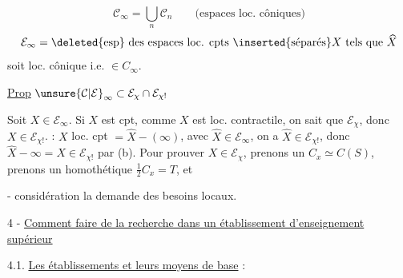 \[
\mathcal C_\infty=\bigcup_n\mathcal C_n\qquad\text{(espaces loc. côniques)}
\]
\[
\mathcal E_\infty=\deleted{\text{esp}}\text{ des espaces loc. cpts }\inserted{\text{séparés}}X\text{ tels que }\widehat X
\]
soit loc. cônique i.e. $\in C_\infty$.


\uline{Prop} $\unsure{\mathcal C|\mathcal E}_\infty\subset\mathcal E_\chi\cap\mathcal E_{\chi!}$

Soit $X\in\mathcal E_\infty$. Si $X$ est cpt,  comme $X$ est loc. contractile,
on sait que $\mathcal E_\chi$, donc $X\in\mathcal E_{\chi!}$.    : $X$ loc.
cpt $=\widehat X-(\infty)$, avec $\widehat X\in\mathcal E_\infty$, on a $\widehat X\in\mathcal E_{\chi!}$, donc
$\widehat X-\infty=X\in\mathcal E_{\chi!}$ par (b). Pour prouver $X\in\mathcal E_\chi$, prenons un
$C_x\simeq C(S)$, prenons un homothétique $\frac12 C_x=T$, et


- considération la demande des besoins locaux.

4 - \uline{Comment faire de la recherche dans un établissement d'enseignement supérieur}

4.1. \uline{Les établissements et leurs moyens de base} :


